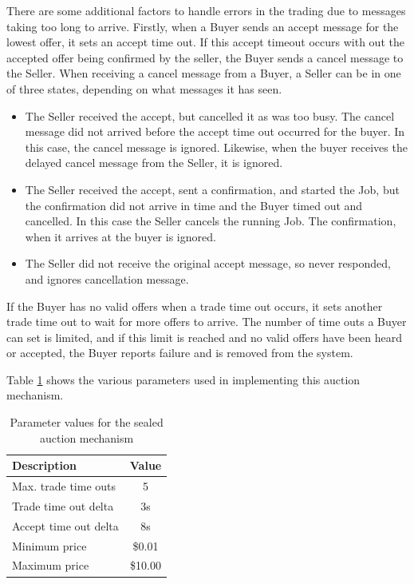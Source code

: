 There are some additional factors to handle errors in the trading due to
messages taking too long to arrive. Firstly, when a Buyer sends an accept
message for the lowest offer, it sets an accept time out. If this accept
timeout occurs with out the accepted offer being confirmed by the seller, the
Buyer sends a cancel message to the Seller. When receiving a cancel message
from a Buyer, a Seller can be in one of three states, depending on what
messages it has seen.

\begin{itemize}

  \item The Seller received the accept, but cancelled it as was too busy. The cancel
    message did not arrived before the accept time out occurred for the
    buyer. In this case, the cancel message is ignored. Likewise, when the
    buyer receives the delayed cancel message from the Seller, it is ignored.

  \item The Seller received the accept, sent a confirmation, and started the Job, but
    the confirmation did not arrive in time and the Buyer timed out and
    cancelled. In this case the Seller cancels the running Job. The
    confirmation, when it arrives at the buyer is ignored.

  \item The Seller did not receive the original accept message, so never
    responded, and ignores cancellation message.

\end{itemize}

If the Buyer has no valid offers when a trade time out occurs, it sets another
trade time out to wait for more offers to arrive. The number of time outs a
Buyer can set is limited, and if this limit is reached and no valid offers have
been heard or accepted, the Buyer reports failure and is removed from the
system.

Table \ref{TABLE:RESULTS:PARAMS} shows the various parameters used in
implementing this auction mechanism.

\begin{table}
  \begin{center}
    \begin{tabular}{| l | c |}
      \hline
      Description & Value \\ 
      \hline
      Max. trade time outs	      & 5 \\
      Trade time out delta     & 3s \\
      Accept time out	delta     & 8s \\
      Minimum price     & \$0.01 \\
      Maximum price     & \$10.00 \\
      \hline
    \end{tabular}
  \end{center}

  \caption{Parameter values for the sealed auction mechanism}
  \label{TABLE:RESULTS:PARAMS}
\end{table}

